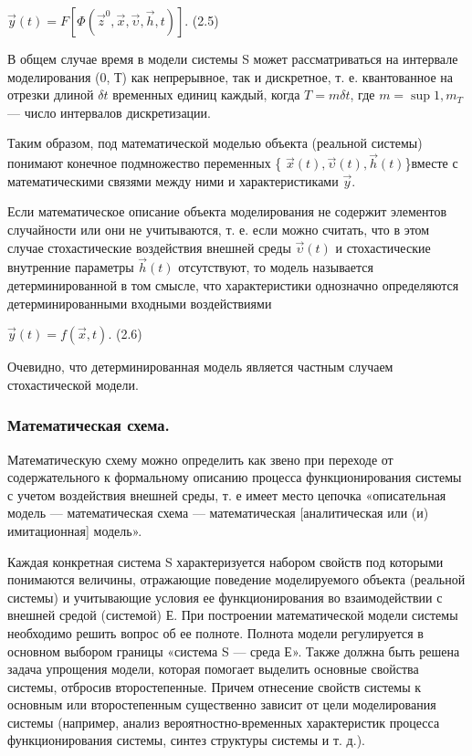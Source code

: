   \begin{center}
    $\vec{y}(t) = F[\Phi(\vec{z}^{0}, \vec{x}, \vec{\upsilon}, \vec{h}, t)]$. (2.5)
  \end{center}

  В общем случае время в модели системы S может рассматриваться на интервале моделирования (0, Т) как непрерывное, так и дискретное, т. е. квантованное на отрезки длиной $\delta t$ временных единиц каждый, когда $T = m\delta t$, где $m = \sup{1,m_{T}}$ — число интервалов дискретизации.

  Таким образом, под математической моделью объекта (реальной системы) понимают конечное подмножество переменных \{ $\vec{x}(t), \vec{\upsilon}(t), \vec{h}(t) $\}вместе с математическими связями между ними и характеристиками $\vec{y}$.

  Если математическое описание объекта моделирования не содержит элементов случайности или они не учитываются, т. е. если можно считать, что в этом случае стохастические воздействия внешней среды $\vec{\upsilon}(t)$ и стохастические внутренние параметры $\vec{h}(t)$ отсутствуют, то модель называется детерминированной в том смысле, что характеристики однозначно определяются детерминированными входными воздействиями

  \begin{center}
    $\vec{y}(t) = f(\vec{x}, t)$. (2.6)
  \end{center}

  Очевидно, что детерминированная модель является частным случаем стохастической модели.

\subsubsection{Математическая схема.}

  Математическую схему можно определить как звено при переходе от содержательного к формальному описанию процесса функционирования системы с учетом воздействия внешней среды, т. е имеет место цепочка «описательная модель — математическая схема — математическая [аналитическая или (и) имитационная] модель».

  Каждая конкретная система S характеризуется набором свойств под которыми понимаются величины, отражающие поведение моделируемого объекта (реальной системы) и учитывающие условия ее функционирования во взаимодействии с внешней средой (системой) Е. При построении математической модели системы необходимо решить вопрос об ее полноте. Полнота модели регулируется в основном выбором границы «система S — среда Е». Также должна быть решена задача упрощения модели, которая помогает выделить основные свойства системы, отбросив второстепенные. Причем отнесение свойств системы к основным или второстепенным существенно зависит от цели моделирования системы (например, анализ вероятностно-временных характеристик процесса функционирования системы, синтез структуры системы и т. д.).

